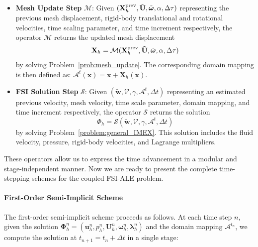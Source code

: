 \documentclass{article}
\newcommand\tU{{\tilde{\mathbf{U}}}}
\newcommand\tomega{{\tilde{\boldsymbol{\omega}}}}
\begin{document}
\begin{itemize}
    \item \textbf{Mesh Update Step} $\mathcal{M}$: 
    Given $(\mathbf{X}_h^{\rm prev}, \tU, \tomega, \alpha, \Delta\tau)$ representing the previous mesh displacement, rigid-body translational and rotational velocities, time scaling parameter, and time increment respectively, the operator $\mathcal{M}$ returns the updated mesh displacement $$\mathbf{X}_h = \mathcal{M}(\mathbf{X}_h^{\rm prev}, \tU, \tomega, \alpha, \Delta\tau)$$ by solving Problem~\ref{prob:mesh_update}. The corresponding domain mapping is then defined as: $\mathcal{A}^t(\mathbf{x}) = \mathbf{x} + \mathbf{X}_h(\mathbf{x})$.

    \item \textbf{FSI Solution Step} $\mathcal{S}$: Given $(\tilde{\mathbf{w}}, \mathcal{V}, \gamma, \mathcal{A}^t, \Delta t)$ representing an estimated previous velocity, mesh velocity, time scale parameter, domain mapping, and time increment respectively, the operator $\mathcal{S}$ returns the solution 
    \[
        {\Phi}_h = \mathcal{S}(\tilde{\mathbf{w}}, \mathcal{V}, \gamma, \mathcal{A}^t, \Delta t)
    \]
    by solving Problem~\ref{problem:general_IMEX}. This solution includes the fluid velocity, pressure, rigid-body velocities, and Lagrange multipliers.
\end{itemize}

These operators allow us to express the time advancement in a modular and stage-independent manner. Now we are ready to present the complete time-stepping schemes for the coupled FSI-ALE problem.

\paragraph{First-Order Semi-Implicit Scheme}
The first-order semi-implicit scheme proceeds as follows. At each time step $n$, given the solution $\boldsymbol{\Phi}_h^n = (\mathbf{u}_h^n, p_h^n, \mathbf{U}_h^n, \boldsymbol{\omega}_h^n, \boldsymbol{\lambda}_h^n)$ and the domain mapping $\mathcal{A}^{t_n}$, we compute the solution at $t_{n+1} = t_n + \Delta t$ in a single stage:

\end{document}
